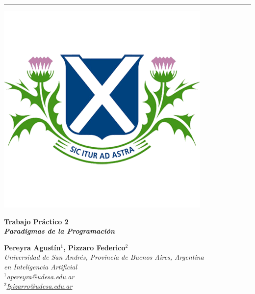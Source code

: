 \documentclass[11pt, a4paper]{article}
\begin{document}
\vspace*{1.5cm} 

{\noindent\rule{\textwidth}{0.5pt}}
\noindent
\begin{minipage}{0.24\textwidth}
    \includegraphics[width=\linewidth]{figures/logo2.png}
\end{minipage}
\hspace{0.02\textwidth}
\begin{minipage}{0.7\textwidth}
    {\fontsize{32}{36}\selectfont\bfseries\color{udesaBlue}\selectfont Trabajo Práctico 2}\\
    {\fontsize{20}{24}\selectfont\bfseries\itshape\color{udesaGreen}\selectfont Paradigmas de la Programación}
\end{minipage}

\begin{minipage}{0.8\textwidth}
    {\large\textbf{\color{udesaBlue} Pereyra Agustín$^{1}$, \color{udesaGreen}Pizzaro Federico$^{2}$}}\\
    {\itshape\small
    Universidad de San Andrés, Provincia de Buenos Aires, Argentina\\
    { en {\color{udesaGreen}Inteligencia Artificial}}\\
    \scriptsize {$^1$\href{mailto:apereyra@udesa.edu.ar}{apereyra@udesa.edu.ar}\\
    $^2$\href{mailto:fpizarro@udesa.edu.ar}{fpizarro@udesa.edu.ar}}
}
\end{minipage}
\vspace{0.5cm}
\end{document}
